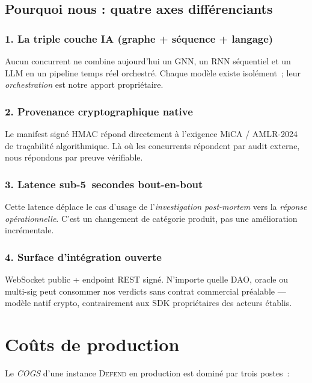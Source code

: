 \documentclass[11pt,a4paper]{article}
\begin{document}
\subsection{Pourquoi nous : quatre axes différenciants}

\subsubsection{1. La triple couche IA (graphe + séquence + langage)}

Aucun concurrent ne combine aujourd'hui un GNN, un RNN séquentiel et un
LLM en un pipeline temps réel orchestré. Chaque modèle existe
isolément~; leur \emph{orchestration} est notre apport propriétaire.

\subsubsection{2. Provenance cryptographique native}

Le manifest signé HMAC répond directement à l'exigence MiCA / AMLR-2024
de traçabilité algorithmique. Là où les concurrents répondent par audit
externe, nous répondons par preuve vérifiable.

\subsubsection{3. Latence sub-5~secondes bout-en-bout}

Cette latence déplace le cas d'usage de l'\emph{investigation
post-mortem} vers la \emph{réponse opérationnelle}. C'est un changement
de catégorie produit, pas une amélioration incrémentale.

\subsubsection{4. Surface d'intégration ouverte}

WebSocket public + endpoint REST signé. N'importe quelle DAO, oracle ou
multi-sig peut consommer nos verdicts sans contrat commercial préalable
--- modèle natif crypto, contrairement aux SDK propriétaires des acteurs
établis.

\section{Coûts de production}

Le \emph{COGS} d'une instance \textsc{Defend} en production est dominé
par trois postes~:
\end{document}
